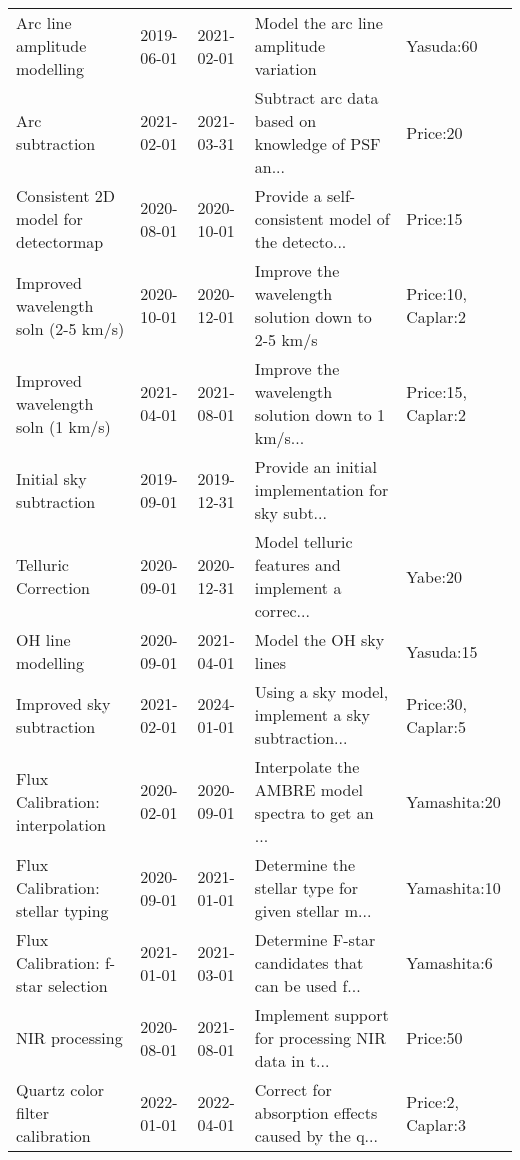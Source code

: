 \begin{longtable}{p{2cm}llp{2cm}l}
                Arc line amplitude modelling &  2019-06-01 &  2021-02-01 &             Model the arc line amplitude variation &               Yasuda:60 \\
                             Arc subtraction &  2021-02-01 &  2021-03-31 &  Subtract arc data based on knowledge of PSF an... &                Price:20 \\
         Consistent 2D model for detectormap &  2020-08-01 &  2020-10-01 &  Provide a self-consistent model of the detecto... &                Price:15 \\
         Improved wavelength soln (2-5 km/s) &  2020-10-01 &  2020-12-01 &   Improve the wavelength solution down to 2-5 km/s &      Price:10, Caplar:2 \\
           Improved wavelength soln (1 km/s) &  2021-04-01 &  2021-08-01 &  Improve the wavelength solution down to 1 km/s... &      Price:15, Caplar:2 \\
                     Initial sky subtraction &  2019-09-01 &  2019-12-31 &  Provide an initial implementation for sky subt... &                         \\
                         Telluric Correction &  2020-09-01 &  2020-12-31 &  Model telluric features and implement a correc... &                 Yabe:20 \\
                           OH line modelling &  2020-09-01 &  2021-04-01 &                             Model the OH sky lines &               Yasuda:15 \\
                    Improved sky subtraction &  2021-02-01 &  2024-01-01 &  Using a sky model, implement a sky subtraction... &      Price:30, Caplar:5 \\
             Flux Calibration: interpolation &  2020-02-01 &  2020-09-01 &  Interpolate the AMBRE model spectra to get an ... &            Yamashita:20 \\
            Flux Calibration: stellar typing &  2020-09-01 &  2021-01-01 &  Determine the stellar type for given stellar m... &            Yamashita:10 \\
          Flux Calibration: f-star selection &  2021-01-01 &  2021-03-01 &  Determine F-star candidates that can be used f... &             Yamashita:6 \\
                              NIR processing &  2020-08-01 &  2021-08-01 &  Implement support for processing NIR data in t... &                Price:50 \\
             Quartz color filter calibration &  2022-01-01 &  2022-04-01 &  Correct for absorption effects caused by the q... &       Price:2, Caplar:3 \\

\end{longtable}
